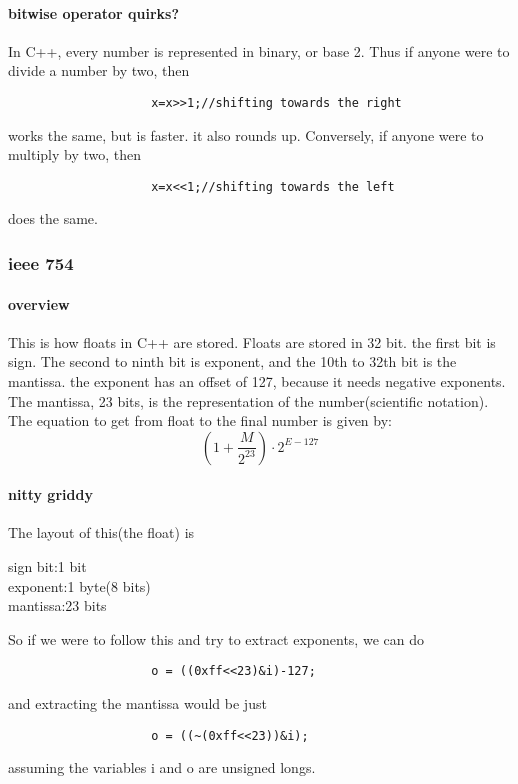 \documentclass{article} %
\theoremstyle{theorem}
\theoremstyle{definition}
\begin{document}
            \paragraph{bitwise operator quirks?}
                In C++, every number is represented in binary, or base 2. Thus if anyone were to divide a number by two, then
                \begin{verbatim}
                    x=x>>1;//shifting towards the right
                \end{verbatim}
                works the same, but is faster. it also rounds up. Conversely, if anyone were to multiply by two, then 
                \begin{verbatim}
                    x=x<<1;//shifting towards the left
                \end{verbatim}
                does the same.
        \subsubsection{ieee 754}
            \paragraph{overview}
                This is how floats in C++ are stored. Floats are stored in 32 bit. the first bit is sign.
                The second to ninth bit is exponent, and the 10th to 32th bit is the mantissa. the exponent has
                an offset of 127, because it needs negative exponents. The mantissa, 23 bits, is the representation of the number(scientific notation).
                The equation to get from float to the final number is given by:
                \begin{equation}
                    (1+\dfrac{M}{2^{23}})\cdot2^{E-127}
                \end{equation}
            \paragraph{nitty griddy}
                The layout of this(the float) is 
                \begin{center}
                    sign bit:1 bit\\
                    exponent:1 byte(8 bits)\\
                    mantissa:23 bits\\
                \end{center}
                So if we were to follow this and try to extract exponents, we can do
                \begin{verbatim}
                    o = ((0xff<<23)&i)-127;
                \end{verbatim}
                and extracting the mantissa would be just 
                \begin{verbatim}
                    o = ((~(0xff<<23))&i);
                \end{verbatim}
                assuming the variables i and o are unsigned longs.
\end{document}
